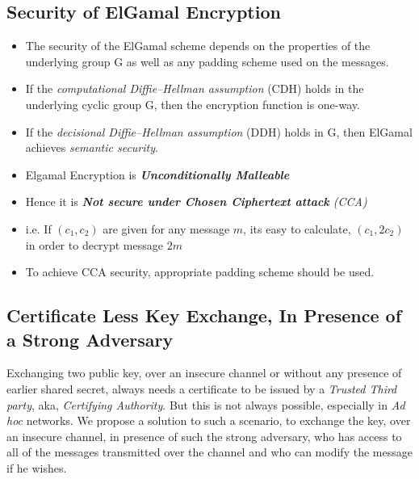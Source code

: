 \documentclass[12pt]{article}
\begin{document}
%
%
%

\subsection{Security of ElGamal Encryption}
\begin{itemize}

\item The security of the ElGamal scheme depends on the properties of the underlying group G as well as any padding scheme used on the messages.
\item If the \textit{computational Diffie–Hellman assumption} (CDH) holds in the underlying cyclic group G, then the encryption function is one-way.
\item If the \textit{decisional Diffie–Hellman assumption} (DDH) holds in G, then ElGamal achieves \textit{semantic security}.
\item Elgamal Encryption is \textit{\textbf{Unconditionally Malleable}}
\item Hence it is \textit{\textbf{Not secure under Chosen Ciphertext attack} (CCA)}
\item i.e. If $(c_1, c_2)$ are given for any message \(m\), its easy to calculate, $(c_1, 2c_2)$ in order to 
decrypt message $2m$
\item To achieve CCA security, appropriate padding scheme should be used.
\end{itemize}











\pagebreak
\vspace*{\fill}
\begin{center}
\section{Certificate Less Key Exchange, In Presence of a Strong Adversary}
Exchanging two public key, over an insecure channel or without any presence of earlier shared secret, 
always needs a certificate to be issued by a \textit{Trusted Third party}, aka, \textit{Certifying Authority}.
But this is not always possible, especially in \textit{Ad hoc} networks. We propose a solution to such a 
scenario, to exchange the key, over an insecure channel, in presence of such the strong adversary, who has 
access to all of the messages transmitted over the channel and who can modify the message if he wishes.
\end{center}
\vspace*{\fill}
\pagebreak
\end{document}
